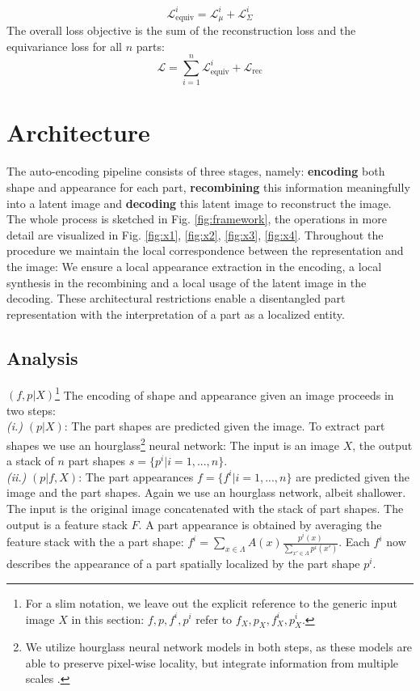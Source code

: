 	\begin{equation}
	\mathcal{L}_{\textrm{equiv}}^i = \mathcal{L}_{\mu}^i+ \mathcal{L}_{\Sigma}^i
	\label{covariance}
	\end{equation}
	The overall loss objective is the sum of the reconstruction loss and the equivariance loss for all $n$ parts:
	\begin{equation}
	\mathcal{L} = \sum_{i=1}^n \mathcal{L}_{\text{equiv}}^i + \mathcal{L}_{\textrm{rec}}
	\end{equation}


\section{Architecture}\label{sec:architecture}
	The auto-encoding pipeline consists of three stages, namely: \textbf{encoding} both shape and appearance for each part,  \textbf{recombining} this information meaningfully into a latent image and \textbf{decoding} this latent image to reconstruct the image. The whole process is sketched in Fig. \ref{fig:framework}, the operations in more detail are visualized in Fig. \ref{fig:x1}, \ref{fig:x2}, \ref{fig:x3},  \ref{fig:x4}. Throughout the procedure we maintain the local correspondence between the representation and the image: We ensure a local appearance extraction in the encoding, a local synthesis in the recombining and a local usage of the latent image in the decoding. These architectural restrictions enable a disentangled part representation with the interpretation of a part as a localized entity. \\

	\subsection{Analysis}
		${(f, p | X)}$\footnote{ For a slim notation, we leave out the explicit reference to the generic input image $X$ in this section: $f, p, f^i, p^i$ refer to $f_X, p_X, f^i_X, p^i_X$.} The encoding of shape and appearance given an image proceeds in two steps: \\
		\emph{(i.)} $(p|X)$: The part shapes are predicted given the image. To extract part shapes we use an hourglass\footnote{ We utilize hourglass neural network models in both steps, as these models are able to preserve pixel-wise locality, but integrate information from multiple scales \cite{hourglass}.}  neural network: The input is an image $X$, the output a stack of $n$ part shapes $s =  \{p^i| i=1, ...,  n\}$.\\ \emph{(ii.)} $(p|f,X)$: The part appearances $f =  \{f^i| i=1, ...,  n\}$ are predicted given the image and the part shapes. Again we use an hourglass network, albeit shallower. The input is the original image concatenated with the stack of part shapes. The output is a feature stack $F$. A part appearance is obtained by averaging the feature stack with the a part shape: $f^i = \sum_{x \in \Lambda} A(x) \frac{p^i(x)}{\sum_{x' \in \Lambda}p^i(x')} $. Each $f^i$ now describes the appearance of a part spatially localized by the part shape $p^i$. \\

